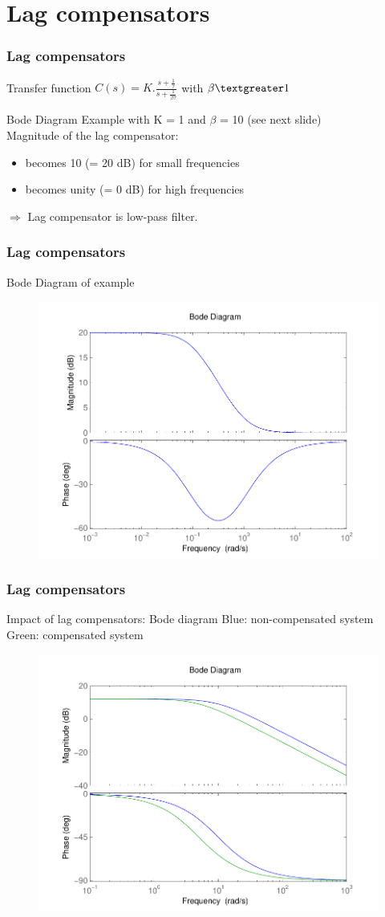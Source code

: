 \section{Lag compensators}

\begin{frame}
	\frametitle{Lag compensators}
	\begin{block}{Transfer function}
		$C(s) = K.\frac{s + \frac{1}{\tau}}{s + \frac{1}{\beta\tau}}$ with $\beta  \textgreater  1$
	\end{block}
	\begin{block}{Bode Diagram}
		Example with K = 1 and $\beta$ = 10 (see next slide) \\ 
		Magnitude of the lag compensator: 
		\begin{itemize}
			\item becomes 10 (= 20 dB) for small frequencies
			\item becomes unity (= 0 dB) for high frequencies
		\end{itemize}
		$\Rightarrow$ Lag compensator is low-pass filter.
		
	\end{block}
\end{frame}

\begin{frame}
\frametitle{Lag compensators}
\begin{block}{Bode Diagram of example}
	\begin{figure}
		\centering
		\includegraphics[width=0.5
		\linewidth]{bodelagislowpass}
	\end{figure}
\end{block}
\end{frame}

\begin{frame}
\frametitle{Lag compensators}
\begin{block}{Impact of lag compensators: Bode diagram}
	Blue: non-compensated system \\
	Green: compensated system
	\begin{figure}
		\centering
		\includegraphics[width=0.5
		\linewidth]{bodelagimpact}
	\end{figure}
\end{block}
\end{frame}

